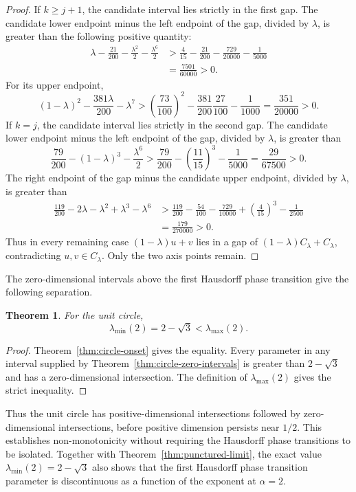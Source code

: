 \documentclass[11pt,a4paper]{amsart}
\numberwithin{equation}{section}
\newtheorem{theorem}{Theorem}[section]
\theoremstyle{definition}
\begin{document}
\begin{proof}
If \(k\ge j+1\), the candidate interval lies strictly in the first gap.
The candidate lower endpoint minus the left endpoint of the gap,
divided by \(\lambda\),
is greater than the following positive quantity:
\[
\begin{aligned}
\lambda-\frac{21}{200}-\frac{\lambda^2}{2}
                      -\frac{\lambda^6}{2}
&>\frac4{15}-\frac{21}{200}
             -\frac{729}{20000}-\frac1{5000}\\
&=\frac{7501}{60000}>0.
\end{aligned}
\]
For its upper endpoint,
\[
(1-\lambda)^2-\frac{381\lambda}{200}-\lambda^7
>\left(\frac{73}{100}\right)^2
 -\frac{381}{200}\frac{27}{100}-\frac1{1000}
=\frac{351}{20000}>0.
\]
If \(k=j\), the candidate interval lies strictly in the second gap.
The candidate lower endpoint minus the left endpoint of the gap,
divided by \(\lambda\),
is greater than
\[
\frac{79}{200}-(1-\lambda)^3-\frac{\lambda^6}{2}
>\frac{79}{200}-\left(\frac{11}{15}\right)^3-\frac1{5000}
=\frac{29}{67500}>0.
\]
The right endpoint of the gap minus the candidate upper endpoint,
divided by \(\lambda\), is greater than
\[
\begin{aligned}
\frac{119}{200}-2\lambda-\lambda^2+\lambda^3-\lambda^6
&>\frac{119}{200}-\frac{54}{100}-\frac{729}{10000}
             +\left(\frac4{15}\right)^3-\frac1{2500}\\
&=\frac{179}{270000}>0.
\end{aligned}
\]
Thus in every remaining case \((1-\lambda)u+v\) lies in a gap of
\((1-\lambda)C_\lambda+C_\lambda\), contradicting \(u,v\in C_\lambda\).
Only the two axis points remain.
\end{proof}

The zero-dimensional intervals above the first Hausdorff phase
transition give the following separation.
\begin{theorem}\label{thm:known-separation}
For the unit circle,
\[
\lambda_{\min}(2)=2-\sqrt3<\lambda_{\max}(2).
\]
\end{theorem}
\begin{proof}
Theorem~\ref{thm:circle-onset} gives the equality. Every parameter
in any interval supplied by Theorem~\ref{thm:circle-zero-intervals}
is greater than \(2-\sqrt3\) and has a zero-dimensional intersection.
The definition of \(\lambda_{\max}(2)\) gives the strict inequality.
\end{proof}

Thus the unit circle has positive-dimensional intersections followed
by zero-dimensional intersections, before positive dimension persists
near \(1/2\). This establishes non-monotonicity without requiring
the Hausdorff phase transitions to be isolated.
Together with Theorem~\ref{thm:punctured-limit}, the exact value
\(\lambda_{\min}(2)=2-\sqrt3\) also shows that the first Hausdorff
phase transition parameter is discontinuous as a function of the
exponent at \(\alpha=2\).
\end{document}
